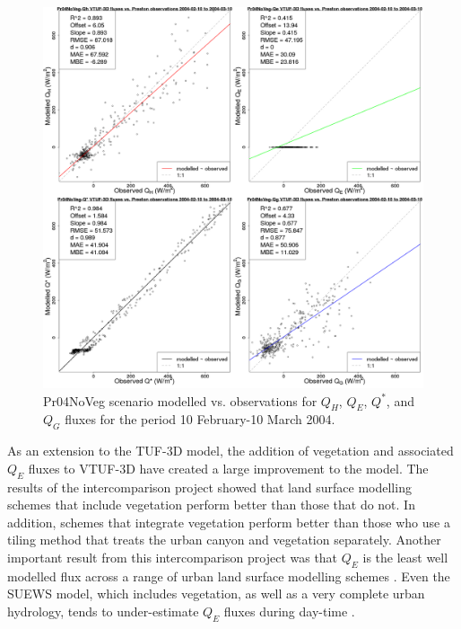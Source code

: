 \documentclass[final,3p,times,authoryear]{elsarticle}
\begin{document}
\begin{figure}[!htbp]
\includegraphics[trim = 0mm 0mm 0mm 0mm, clip, scale=0.30]{images/Pr04NoVeg-ErrorPlots.png}
\caption{Pr04NoVeg scenario modelled vs. observations for $Q_{H}$, $Q_{E}$, $Q^{*}$, and $Q_{G}$ fluxes for the period 10 February-10 March 2004. \label{fig:Prestonnovegerror}}    
\end{figure}

As an extension to the TUF-3D model, the addition of vegetation and associated $Q_{E}$ fluxes to VTUF-3D have created a large improvement to the model. The results of the intercomparison project \citep{Grimmond2011,Best2012} showed that land surface modelling schemes that include vegetation perform better than those that do not. In addition, schemes that integrate vegetation perform better than those who use a tiling method that treats the urban canyon and vegetation separately. Another important result from this intercomparison project was that $Q_{E}$ is the least well modelled flux across a range of urban land surface modelling schemes \citep{Grimmond2010}. Even the SUEWS model, which includes vegetation, as well as a very complete urban hydrology, tends to under-estimate $Q_{E}$ fluxes during day-time \citep{Jarvi2011}.
\end{document}
